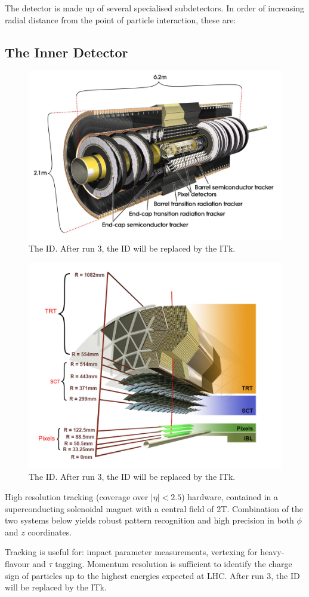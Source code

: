 The detector is made up of several specialised subdetectors. In order of increasing radial distance from the point of particle interaction, these are:





\subsection{The Inner Detector}

\begin{figure}[!htpb]
  \centering
  \includegraphics[width=0.4\linewidth]{chapters/2.detector/figs/atlas_id.jpg}
  \caption{The \ATLAS ID. After run 3, the ID will be replaced by the ITk.}
  \label{fig:atlas_id_run1}
\end{figure}



%
\begin{figure}[!htpb]
  \centering
  \includegraphics[width=0.4\linewidth]{chapters/2.detector/figs/atlas_id_xs.png}
  \caption{The \ATLAS ID. After run 3, the ID will be replaced by the ITk.}
  \label{fig:atlas_id_run2}
\end{figure}
%

High resolution tracking (coverage over $|\eta| < 2.5$) hardware, contained in a superconducting solenoidal magnet with a central field of 2T. Combination of the two systems below yields robust pattern recognition and high precision in both $\phi$ and $z$ coordinates.

Tracking is useful for: impact parameter measurements, vertexing for heavy-flavour and $\tau$ tagging. Momentum resolution is sufficient to identify the charge sign of particles up to the highest energies expected at LHC. After run 3, the ID will be replaced by the ITk.


